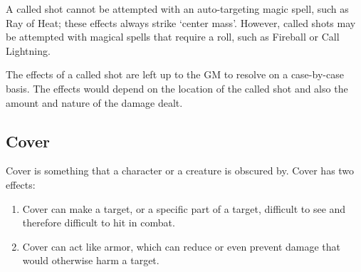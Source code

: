\documentclass[twoside]{book}
\begin{document}
    {  
     A called shot cannot be attempted with an
               auto-targeting magic spell, such as Ray of Heat; these
               effects always strike `center mass'. However,
               called shots may be attempted with magical spells that
               require a roll, such as Fireball or Call Lightning.
               
    }
  
    {  
     The effects of a called shot are left up to the GM
               to resolve on a case-by-case basis. The effects would
               depend on the location of the called shot and also the
               amount and nature of the damage dealt. 
    }
  
  

  

  
  

  

  
    

\subsection{Cover}
    
    {  
     Cover is something that a character or a creature
               is obscured by. Cover has two effects: 
    }
  
\begin{enumerate}
      
  \item 
                
    {  
     Cover can make a target, or a specific part of a
                 target, difficult to see and therefore difficult to hit
                 in combat. 
    }
  
              
  \item 
                
    {  
    Cover can act like armor, which can reduce or even
                 prevent damage that would otherwise harm a target.
                 
    }
  
              
\end{enumerate}
  
\end{document}
